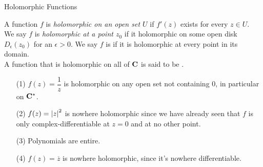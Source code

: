 \vspace*{1em}

\begin{mdframed}
\begin{center}
{\Large Holomorphic Functions}
\end{center}
\end{mdframed}

\begin{definition}
A function $f$ is \emph{holomorphic on an open set $U$} if $f'(z)$ exists for every $z \in U$.\\[0.5em]
We say $f$ is \emph{holomorphic at a point $z_0$} if it holomorphic on some open disk $D_\epsilon(z_0)$ for an $\epsilon > 0$. We say $f$ is  if it is holomorphic at every point in its domain.\\[0.5em]
A function that is holomorphic on all of $\mathbf C$ is said to be . 
\end{definition}

\vspace*{1em}

\begin{example}\hfill
\begin{itemize}
\item[(1)] $f(z) = \dfrac{1}{z}$ is holomorphic on any open set not containing $0$, in particular on $\mathbf C^*$.
\item[(2)] $f(z) = \left\lvert z\right\rvert^2$ is nowhere holomorphic since we have already seen that $f$ is only complex-differentiable at $z = 0$ and at no other point.
\item[(3)] Polynomials are entire.
\item[(4)] $f(z) = \overline{z}$ is nowhere holomorphic, since it's nowhere differentiable.
\end{itemize}
\end{example}

\vspace*{1em}

